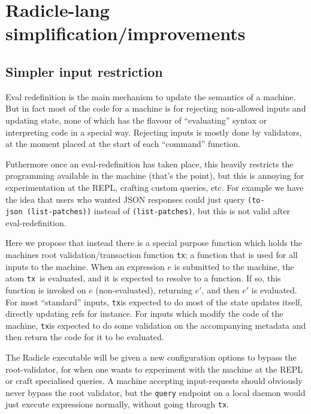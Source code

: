 \documentclass[a4paper, oneside, 10pt]{amsart}
\def\tx{\texttt{tx}}
\begin{document}
\section{Radicle-lang simplification/improvements}\label{radicle-lang-simplificationimprovements}

\subsection{Simpler input restriction}\label{simpler-input-restriction}

Eval redefinition is the main mechanism to update the semantics of a
machine. But in fact most of the code for a machine is for rejecting non-allowed
inputs and updating state, none of which has the flavour of ``evaluating''
syntax or interpreting code in a special way. Rejecting inputs is mostly done by
validators, at the moment placed at the start of each ``command'' function.

Futhermore once an eval-redefinition has taken place, this heavily restricts the
programming available in the machine (that's the point), but this is annoying
for experimentation at the REPL, crafting custom queries, etc. For example we
have the idea that users who wanted JSON responses could just query
\texttt{(to-json\ (list-patches))} instead of \texttt{(list-patches)}, but this
is not valid after eval-redefinition.

Here we propose that instead there is a special purpose function which holds the
machines root validation/transaction function \tx; a function that is used for
all inputs to the machine. When an expression $e$ is submitted to the machine,
the atom \tx~is evaluated, and it is expected to resolve to a function. If so,
this function is invoked on $e$ (non-evaluated), returning $e'$, and then $e'$
is evaluated. For most ``standard'' inputs, \tx is expected to do most of the
state updates itself, directly updating refs for instance. For inputs which
modify the code of the machine, \tx is expected to do some validation on the
accompanying metadata and then return the code for it to be evaluated.

The Radicle executable will be given a new configuration options to bypass the
root-validator, for when one wants to experiment with the machine at the REPL or
craft specialised queries. A machine accepting input-requests should obviously
never bypass the root validator, but the \texttt{query} endpoint on a local
daemon would just execute expressions normally, without going through \tx.
\end{document}
